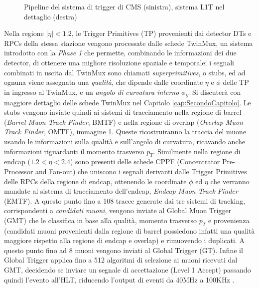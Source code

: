 \begin{figure}[t]
\begin{minipage}[b]{0.48\textwidth}
  \end{minipage}
  \caption{Pipeline del sistema di trigger di CMS (sinistra), sistema L1T nel dettaglio (destra)}
  \label{fig:TriggerSystem}
\end{figure}

Nella regione $|\eta| < 1.2$, le Trigger Primitives (TP) provenienti dai detector DTs e RPCs della stessa stazione vengono processate dalle schede TwinMux, un sistema introdotto con la \textit{Phase 1} che permette, combinando le informazioni dei due detector, di ottenere una migliore risoluzione spaziale e temporale; i segnali combinati in uscita dal TwinMux sono chiamati \textit{superprimitives}, o stubs, ed ad ognuna viene assegnata una \textit{qualità}, che dipende dalle coordinate $\eta$ e $\phi$ delle TP in ingresso al TwinMux, e un \textit{angolo di curvatura interno} $\phi_b$. 
Si discuterà con maggiore dettaglio delle schede TwinMux nel Capitolo \ref{cap:SecondoCapitolo}. \newline
Le stubs vengono inviate quindi ai sistemi di tracciamento nella regione di barrel (\textit{Barrel Muon Track Finder}, BMTF) e nella regione di overlap (\textit{Overlap Muon Track Finder}, OMTF), immagine \ref{fig:TriggerSystem}. Queste  ricostruiranno la traccia del muone usando le informazioni sulla qualità e sull'angolo di curvatura, ricavando anche informazioni riguardanti il momento trasverso $p_T$. \newline
Similmente nella regione di endcap ($1.2 < \eta < 2.4$) sono presenti delle schede CPPF (Concentrator Pre-Processor and Fan-out) che uniscono i segnali derivanti dalle Trigger Primitives delle RPCs della regione di endcap, ottenendo le coordinate $\phi$ ed $\eta$ che verranno mandate al sistema di tracciamento dell'endcap, \textit{Endcap Muon Track Finder} (EMTF). \newline
A questo punto fino a 108 tracce generate dai tre sistemi di tracking, corrispondenti a \textit{candidati muoni}, vengono inviate al Global Muon Trigger (GMT) che le classifica in base alla qualità, momento trasverso $p_T$ e provenienza (candidati muoni provenienti dalla regione di barrel possiedono infatti una qualità maggiore rispetto alla regione di endcap e overlap) e rimuovendo i duplicati. A questo punto fino ad 8 muoni vengono inviati al Global Trigger (GT). \newline
Infine il Global Trigger applica fino a 512 algoritmi di selezione ai muoni ricevuti dal GMT, decidendo se inviare un segnale di accettazione (Level 1 Accept) passando quindi l'evento all'HLT, riducendo l'output di eventi da 40MHz a 100KHz \cite{CERNsummerSchool}.

